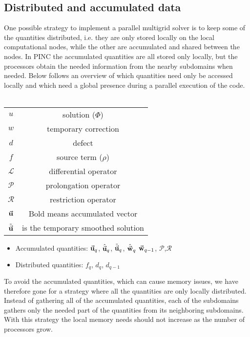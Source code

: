 	\subsection{Distributed and accumulated data}
		One possible strategy to implement a parallel multigrid solver is to keep
		some of the quantities distributed, i.e. they are only stored locally
		on the local computational nodes, while the other are accumulated and
		shared between the nodes. In PINC the accumulated quantities
 		are all stored only locally, but the processors obtain the needed information
		from the nearby subdomains when needed. Below follows an overview of which quantities
		need only be accessed locally and which need a global presence
		during a parallel execution of the code.
	\\	\\
		\begin{tabular} {c c}
			\(u\) & solution (\(\Phi\))
			\\
			\(w\) & temporary correction
			\\
			\(d\) & defect \\
			\(f\) & source term (\(\rho\)) \\
			\(\mathcal{L}\) & differential operator \\
			\(\mathcal{P}\) & prolongation operator \\
			\(\mathcal{R}\) & restriction operator \\
			 \( \va{u}\) & Bold means accumulated vector \\
			\( \tilde{\va{ u }} \) & is the temporary smoothed solution
		\end{tabular}

		\begin{itemize}
			\item Accumulated quantities:	\(\va{u}_q\), \( \hat{\va{u}}_q \), \(\tilde{\va{u}}_q\), \(\hat{\va{w}}_q\) \(\va{w}_{q-1}\), \(\mathcal{P}\),\(\mathcal{R}\)
			\item Distributed quantities:  \( f_q \), \(d_q\), \(d_{q-1}\)
		\end{itemize}

		To avoid the accumulated quantities, which can cause memory issues, we have therefore
		gone for a strategy where all the quantities are only locally distributed.
		Instead of gathering all of the accumulated quantities, each of the subdomains
		gathers only the needed part of the quantities from its neighboring subdomains.
		With this strategy the local memory needs should not increase as the number
		of processors grow.

